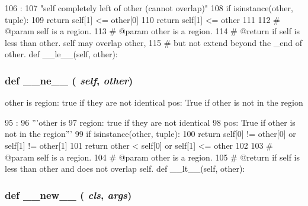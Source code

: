 \begin{DoxyCode}
106                            :
107         "self completely left of other (cannot overlap)"
108         if isinstance(other, tuple):
109             return self[1] <= other[0]
110         return self[1] <= other
111 
112     # @param self is a region.
113     # @param other is a region.
114     # @return if self is less than other.  self may overlap other,
115     # but not extend beyond the _end of other.
    def __le__(self, other):
\end{DoxyCode}
\hypertarget{classm5_1_1util_1_1region_1_1Region_ad69df72a6bf0be3525fe45cd2f77f343}{
\subsubsection[{\_\-\_\-ne\_\-\_\-}]{\setlength{\rightskip}{0pt plus 5cm}def \_\-\_\-ne\_\-\_\- ( {\em self}, \/   {\em other})}}
\label{classm5_1_1util_1_1region_1_1Region_ad69df72a6bf0be3525fe45cd2f77f343}
\begin{DoxyVerb}other is
region: true if they are not identical
pos: True if other is not in the region\end{DoxyVerb}
 


\begin{DoxyCode}
95                            :
96         '''other is
97         region: true if they are not identical
98         pos: True if other is not in the region'''
99         if isinstance(other, tuple):
100             return self[0] != other[0] or self[1] != other[1]
101         return other < self[0] or self[1] <= other
102 
103     # @param self is a region.
104     # @param other is a region.
105     # @return if self is less than other and does not overlap self.
    def __lt__(self, other):
\end{DoxyCode}
\hypertarget{classm5_1_1util_1_1region_1_1Region_a2f15a4676204349e06bcced484b06b70}{
\subsubsection[{\_\-\_\-new\_\-\_\-}]{\setlength{\rightskip}{0pt plus 5cm}def \_\-\_\-new\_\-\_\- ( {\em cls}, \/   {\em args})}}
\label{classm5_1_1util_1_1region_1_1Region_a2f15a4676204349e06bcced484b06b70}



